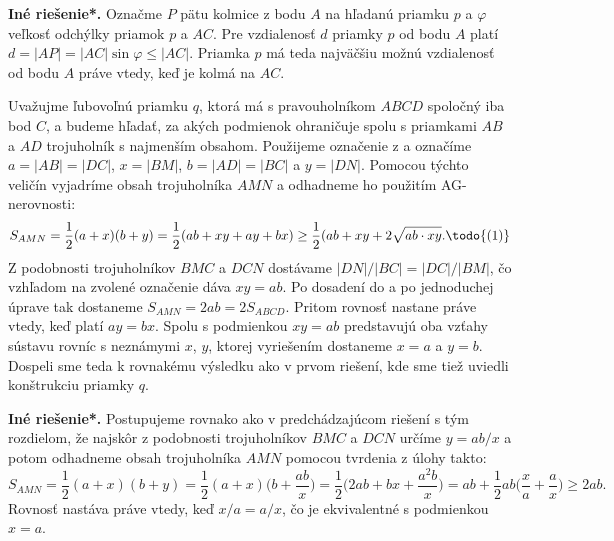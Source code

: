 {\textbf{Iné riešenie*.} Označme $P$ pätu kolmice z bodu $A$ na hľadanú priamku $p$ a $\varphi$ veľkosť odchýlky priamok $p$ a $AC$. Pre vzdialenosť $d$ priamky $p$ od bodu $A$ platí $d = |AP| = |AC| \sin \varphi \leq |AC|$. Priamka $p$ má teda najväčšiu možnú vzdialenosť od bodu $A$ práve vtedy, keď je kolmá na $AC$.

Uvažujme ľubovoľnú priamku $q$, ktorá má s pravouholníkom $ABCD$ spoločný iba
bod $C$, a budeme hľadať, za akých podmienok ohraničuje spolu s priamkami $AB$ a $AD$
trojuholník s najmenším obsahom. Použijeme označenie z  a označíme $a = |AB|
= |DC|$, $x = |BM|$, $b = |AD| = |BC|$ a $y = |DN|$. Pomocou týchto veličín vyjadríme
obsah trojuholníka $AMN$ a odhadneme ho použitím AG-nerovnosti:
$$S_{AMN}=\frac{1}{2}(a + x)(b + y) = \frac{1}{2}(ab + xy + ay + bx)\geq \frac{1}{2}(ab + xy + 2\sqrt{ab \cdot xy}. \todo{(1)}$$
Z podobnosti trojuholníkov $BMC$ a $DCN$ dostávame $|DN|/|BC| = |DC|/|BM|$, čo
vzhľadom na zvolené označenie dáva $xy = ab$. Po dosadení do  a po jednoduchej
úprave tak dostaneme $S_{AMN} = 2ab = 2S_{ABCD}$. Pritom rovnosť nastane práve vtedy, keď platí $ay = bx$. Spolu s podmienkou $xy = ab$ predstavujú oba vzťahy sústavu rovníc s neznámymi $x$, $y$, ktorej vyriešením dostaneme $x = a$ a $y = b$. Dospeli sme teda
k rovnakému výsledku ako v prvom riešení, kde sme tiež uviedli konštrukciu priamky $q$.

\textbf{Iné riešenie*.} Postupujeme rovnako ako v predchádzajúcom riešení s tým rozdielom, že najskôr z podobnosti trojuholníkov $BMC$ a $DCN$ určíme $y = ab/x$ a potom odhadneme obsah trojuholníka $AMN$ pomocou tvrdenia z úlohy  takto:
$$S_{AMN} =\frac{1}{2}(a + x)(b + y) =\frac{1}{2}(a + x)\bigg(b +\frac{ab}{x}\bigg)=\frac{1}{2}\bigg(2ab + bx + \frac{a^2 b}{x}\bigg)= ab +\frac{1}{2}ab\bigg(\frac{x}{a}+\frac{a}{x}\bigg)\geq 2ab.$$
Rovnosť nastáva práve vtedy, keď $x/a = a/x$, čo je ekvivalentné s podmienkou $x = a$.
}
